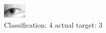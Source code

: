\begin{figure}[h!]
\begin{center}
\includegraphics[width=0.60\columnwidth]{figures/ID1319_class_4_target_3.png}
\end{center}
\caption{ Classification: 4 actual target: 3}
\label{fig:ID1319_class_4_target_3}
\end{figure}
